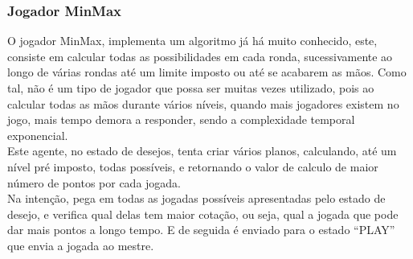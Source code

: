 \documentclass[12pt]{article}
\begin{document}
	\subsubsection*{Jogador MinMax}
    O jogador MinMax, implementa um algoritmo já há muito conhecido, este, consiste em calcular todas as possibilidades em cada ronda, sucessivamente ao longo de várias rondas até um limite imposto ou até se acabarem as mãos. Como tal, não é um tipo de jogador que possa ser muitas vezes utilizado, pois ao calcular todas as mãos durante vários níveis, quando mais jogadores existem no jogo, mais tempo demora a responder, sendo a complexidade temporal exponencial.\\
    Este agente, no estado de desejos, tenta criar vários planos, calculando, até um nível pré imposto, todas possíveis, e retornando o valor de calculo de maior número de pontos por cada jogada.\\
     Na intenção, pega em todas as jogadas possíveis apresentadas pelo estado de desejo, e verifica qual delas tem maior cotação, ou seja, qual a jogada que pode dar mais pontos a longo tempo. E de seguida é enviado para o estado “PLAY” que envia a jogada ao mestre.\\
\end{document}
